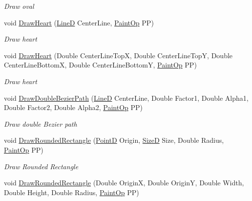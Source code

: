 \begin{DoxyCompactItemize}
\begin{DoxyCompactList}\small\item\em Draw oval \end{DoxyCompactList}\item 
void \hyperlink{class_pdf_file_writer_1_1_pdf_contents_a7970c5b6f1f370a54449bcf2d2e73c31}{Draw\+Heart} (\hyperlink{class_pdf_file_writer_1_1_line_d}{LineD} Center\+Line, \hyperlink{namespace_pdf_file_writer_a1bd0bc3fdabed20e2459496f1bbe2101}{Paint\+Op} PP)
\begin{DoxyCompactList}\small\item\em Draw heart \end{DoxyCompactList}\item 
void \hyperlink{class_pdf_file_writer_1_1_pdf_contents_afdf141a32571fdcbe158ede02ec32608}{Draw\+Heart} (Double Center\+Line\+TopX, Double Center\+Line\+TopY, Double Center\+Line\+BottomX, Double Center\+Line\+BottomY, \hyperlink{namespace_pdf_file_writer_a1bd0bc3fdabed20e2459496f1bbe2101}{Paint\+Op} PP)
\begin{DoxyCompactList}\small\item\em Draw heart \end{DoxyCompactList}\item 
void \hyperlink{class_pdf_file_writer_1_1_pdf_contents_a8e1fa3ceff3f513d8fa6f2721b866eab}{Draw\+Double\+Bezier\+Path} (\hyperlink{class_pdf_file_writer_1_1_line_d}{LineD} Center\+Line, Double Factor1, Double Alpha1, Double Factor2, Double Alpha2, \hyperlink{namespace_pdf_file_writer_a1bd0bc3fdabed20e2459496f1bbe2101}{Paint\+Op} PP)
\begin{DoxyCompactList}\small\item\em Draw double Bezier path \end{DoxyCompactList}\item 
void \hyperlink{class_pdf_file_writer_1_1_pdf_contents_a78ae3198fcff7b2f9c535681f982e84c}{Draw\+Rounded\+Rectangle} (\hyperlink{class_pdf_file_writer_1_1_point_d}{PointD} Origin, \hyperlink{class_pdf_file_writer_1_1_size_d}{SizeD} Size, Double Radius, \hyperlink{namespace_pdf_file_writer_a1bd0bc3fdabed20e2459496f1bbe2101}{Paint\+Op} PP)
\begin{DoxyCompactList}\small\item\em Draw Rounded Rectangle \end{DoxyCompactList}\item 
void \hyperlink{class_pdf_file_writer_1_1_pdf_contents_ac00fdd8aea34bdcdee03f7bf6071fc22}{Draw\+Rounded\+Rectangle} (Double OriginX, Double OriginY, Double Width, Double Height, Double Radius, \hyperlink{namespace_pdf_file_writer_a1bd0bc3fdabed20e2459496f1bbe2101}{Paint\+Op} PP)

\end{DoxyCompactItemize}
